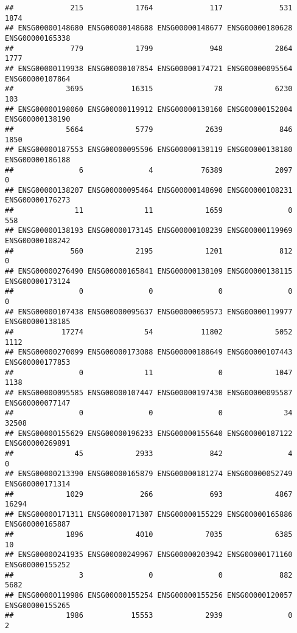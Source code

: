 \documentclass[
]{article}
\begin{document}
\begin{verbatim}
##             215            1764             117             531            1874 
## ENSG00000148680 ENSG00000148688 ENSG00000148677 ENSG00000180628 ENSG00000165338 
##             779            1799             948            2864            1777 
## ENSG00000119938 ENSG00000107854 ENSG00000174721 ENSG00000095564 ENSG00000107864 
##            3695           16315              78            6230             103 
## ENSG00000198060 ENSG00000119912 ENSG00000138160 ENSG00000152804 ENSG00000138190 
##            5664            5779            2639             846            1850 
## ENSG00000187553 ENSG00000095596 ENSG00000138119 ENSG00000138180 ENSG00000186188 
##               6               4           76389            2097               0 
## ENSG00000138207 ENSG00000095464 ENSG00000148690 ENSG00000108231 ENSG00000176273 
##              11              11            1659               0             558 
## ENSG00000138193 ENSG00000173145 ENSG00000108239 ENSG00000119969 ENSG00000108242 
##             560            2195            1201             812               0 
## ENSG00000276490 ENSG00000165841 ENSG00000138109 ENSG00000138115 ENSG00000173124 
##               0               0               0               0               0 
## ENSG00000107438 ENSG00000095637 ENSG00000059573 ENSG00000119977 ENSG00000138185 
##           17274              54           11802            5052            1112 
## ENSG00000270099 ENSG00000173088 ENSG00000188649 ENSG00000107443 ENSG00000177853 
##               0              11               0            1047            1138 
## ENSG00000095585 ENSG00000107447 ENSG00000197430 ENSG00000095587 ENSG00000077147 
##               0               0               0              34           32508 
## ENSG00000155629 ENSG00000196233 ENSG00000155640 ENSG00000187122 ENSG00000269891 
##              45            2933             842               4               0 
## ENSG00000213390 ENSG00000165879 ENSG00000181274 ENSG00000052749 ENSG00000171314 
##            1029             266             693            4867           16294 
## ENSG00000171311 ENSG00000171307 ENSG00000155229 ENSG00000165886 ENSG00000165887 
##            1896            4010            7035            6385              10 
## ENSG00000241935 ENSG00000249967 ENSG00000203942 ENSG00000171160 ENSG00000155252 
##               3               0               0             882            5682 
## ENSG00000119986 ENSG00000155254 ENSG00000155256 ENSG00000120057 ENSG00000155265 
##            1986           15553            2939               0               2 

\end{verbatim}
\end{document}
